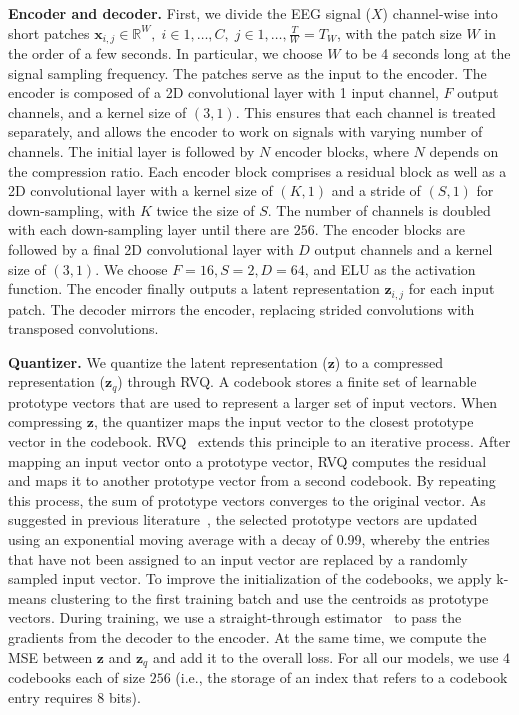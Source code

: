 \documentclass{article} %
\begin{document}
\textbf{Encoder and decoder.} First, we divide the EEG signal ($X$) channel-wise into short patches $\bm{x}_{i, j} \in \mathbb{R}^W, \; i \in {1, \dots, C}, \; j \in {1, \dots, \frac{T}{W} = T_W}$, with the patch size $W$ in the order of a few seconds. In particular, we choose $W$ to be 4 seconds long at the signal sampling frequency. The patches serve as the input to the encoder. The encoder is composed of a 2D convolutional layer with 1 input channel, $F$ output channels, and a kernel size of $(3, 1)$. This ensures that each channel is treated separately, and allows the encoder to work on signals with varying number of channels. The initial layer is followed by $N$ encoder blocks, where $N$ depends on the compression ratio. Each encoder block comprises a residual block as well as a 2D convolutional layer with a kernel size of $(K, 1)$ and a stride of $(S, 1)$ for down-sampling, with $K$ twice the size of $S$. The number of channels is doubled with each down-sampling layer until there are $256$. The encoder blocks are followed by a final 2D convolutional layer with $D$ output channels and a kernel size of $(3, 1)$. We choose $F = 16, S = 2, D = 64$, and ELU as the activation function. The encoder finally outputs a latent representation $\bm{z}_{i, j}$ for each input patch. The decoder mirrors the encoder, replacing strided convolutions with transposed convolutions. 


\textbf{Quantizer.} We quantize the latent representation ($\bm{z}$) to a compressed representation ($\bm{z}_{q}$) through RVQ. A codebook stores a finite set of learnable prototype vectors that are used to represent a larger set of input vectors. When compressing $\bm{z}$, the quantizer maps the input vector to the closest prototype vector in the codebook. RVQ~\citep{Zeghidour2022} extends this principle to an iterative process. After mapping an input vector onto a prototype vector, RVQ computes the residual and maps it to another prototype vector from a second codebook. By repeating this process, the sum of prototype vectors converges to the original vector.
As suggested in previous literature~\citep{Zeghidour2022, Dhariwal2020}, the selected prototype vectors are updated using an exponential moving average with a decay of 0.99, whereby the entries that have not been assigned to an input vector are replaced by a randomly sampled input vector. To improve the initialization of the codebooks, we apply k-means clustering to the first training batch and use the centroids as prototype vectors. During training, we use a straight-through estimator~\citep{Bengio2013} to pass the gradients from the decoder to the encoder. At the same time, we compute the MSE between $\bm{z}$ and $\bm{z}_q$ and add it to the overall loss. For all our models, we use $4$ codebooks each of size $256$ (i.e., the storage of an index that refers to a codebook entry requires $8$ bits).
\end{document}
